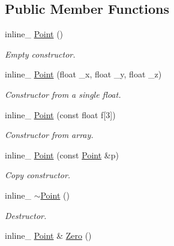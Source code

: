 \subsection*{Public Member Functions}
\begin{DoxyCompactItemize}
\item 
inline\+\_\+ \hyperlink{classPoint_a3f3c6aaaaf8bb929e1dfe870e6b7a6b2}{Point} ()\hypertarget{classPoint_a3f3c6aaaaf8bb929e1dfe870e6b7a6b2}{}\label{classPoint_a3f3c6aaaaf8bb929e1dfe870e6b7a6b2}

\begin{DoxyCompactList}\small\item\em Empty constructor. \end{DoxyCompactList}\item 
inline\+\_\+ \hyperlink{classPoint_ad1a439c6c64387683afd647cba78bc62}{Point} (float \+\_\+x, float \+\_\+y, float \+\_\+z)
\begin{DoxyCompactList}\small\item\em Constructor from a single float. \end{DoxyCompactList}\item 
inline\+\_\+ \hyperlink{classPoint_a168adb38b31f5c7527dbfb3ad003dc3c}{Point} (const float f\mbox{[}3\mbox{]})\hypertarget{classPoint_a168adb38b31f5c7527dbfb3ad003dc3c}{}\label{classPoint_a168adb38b31f5c7527dbfb3ad003dc3c}

\begin{DoxyCompactList}\small\item\em Constructor from array. \end{DoxyCompactList}\item 
inline\+\_\+ \hyperlink{classPoint_a0dafe63b549ef952e7fd043f2506a4e6}{Point} (const \hyperlink{classPoint}{Point} \&p)\hypertarget{classPoint_a0dafe63b549ef952e7fd043f2506a4e6}{}\label{classPoint_a0dafe63b549ef952e7fd043f2506a4e6}

\begin{DoxyCompactList}\small\item\em Copy constructor. \end{DoxyCompactList}\item 
inline\+\_\+ \hyperlink{classPoint_a4fe2294903b5b3fc374dd640507a4793}{$\sim$\+Point} ()\hypertarget{classPoint_a4fe2294903b5b3fc374dd640507a4793}{}\label{classPoint_a4fe2294903b5b3fc374dd640507a4793}

\begin{DoxyCompactList}\small\item\em Destructor. \end{DoxyCompactList}\item 
inline\+\_\+ \hyperlink{classPoint}{Point} \& \hyperlink{classPoint_a8effe6ba1410e857de6f026e14229c24}{Zero} ()\hypertarget{classPoint_a8effe6ba1410e857de6f026e14229c24}{}\label{classPoint_a8effe6ba1410e857de6f026e14229c24}


\end{DoxyCompactItemize}
